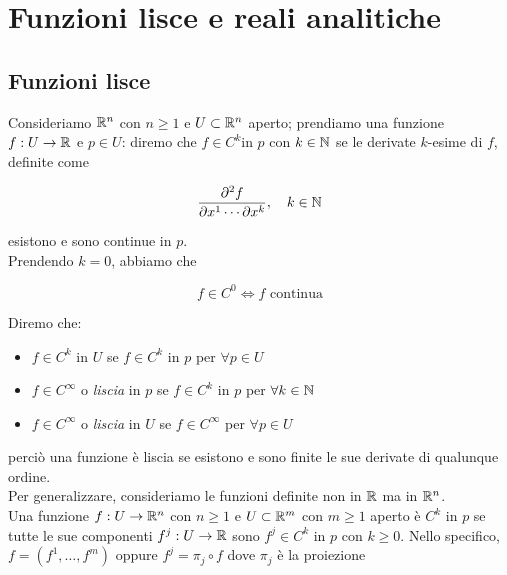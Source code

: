 \section{Funzioni lisce e reali analitiche}

\subsection{Funzioni lisce}

Consideriamo $ \mathbb{R}^{n} $ con $ n \geq 1 $ e $ U \subset \mathbb{R}^{n} $ aperto; prendiamo una funzione $ f : U \to \mathbb{R} $ e $ p \in U $: diremo che $ f \in C^{k} $in $ p $ con $ k \in \mathbb{N} $ se le derivate $ k $-esime di $ f $, definite come

\begin{equation}
	\pdv[k]{f}{x^{1} \cdots}{x^{k}} \qcomma k \in \N
\end{equation}

esistono e sono continue in $ p $.\\
Prendendo $ k = 0 $, abbiamo che

\begin{equation}
	f \in C^{0} \iff f \text{ continua}
\end{equation}

Diremo che:

\begin{itemize}
	\item $ f \in C^{k} $ in $ U $ se $ f \in C^{k} $ in $ p $ per $ \forall p \in U $
	
	\item $ f \in C^{\infty} $ o \textit{liscia} in $ p $ se $ f \in C^{k} $ in $ p $ per $ \forall k \in \mathbb{N} $
	
	\item $ f \in C^{\infty} $ o \textit{liscia} in $ U $ se $ f \in C^{\infty} $ per $ \forall p \in U $
\end{itemize}

perciò una funzione è liscia se esistono e sono finite le sue derivate di qualunque ordine.\\
Per generalizzare, consideriamo le funzioni definite non in $ \mathbb{R} $ ma in $ \mathbb{R}^{n} $.\\
Una funzione $ f : U \to \mathbb{R}^{n} $ con $ n \geq 1 $ e $ U \subset \mathbb{R}^{m} $ con $ m \geq 1 $ aperto è $ C^{k} $ in $ p $ se tutte le sue componenti $ f^{j} : U \to \mathbb{R} $ sono $ f^{j} \in C^{k} $ in $ p $ con $ k \geq 0 $. Nello specifico, $ f = (f^{1}, \dots, f^{m}) $ oppure $ f^{j} = \pi_{j} \circ f $ dove $ \pi_{j} $ è la proiezione

